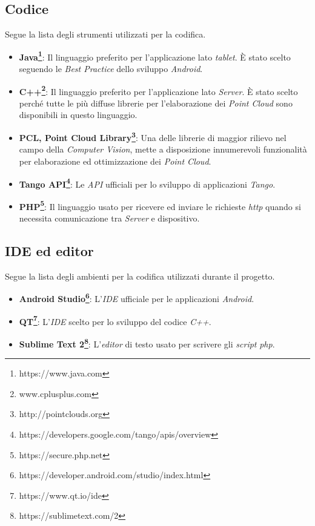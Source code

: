 \subsection{Codice}
Segue la lista degli strumenti utilizzati per la codifica.
\begin{itemize}
	\item \textbf{Java\footnote{https://www.java.com}}: Il linguaggio preferito per l'applicazione lato \emph{tablet}. È stato scelto seguendo le \emph{Best Practice} dello sviluppo \emph{Android}.
	\item \textbf{C++\footnote{www.cplusplus.com}}: Il linguaggio preferito per l'applicazione lato \emph{Server}. È stato scelto perché tutte le più diffuse librerie per l'elaborazione dei \emph{Point Cloud} sono disponibili in questo linguaggio.
	\item \textbf{PCL, Point Cloud Library\footnote{http://pointclouds.org}}: Una delle librerie di maggior rilievo nel campo della \emph{Computer Vision}, mette a disposizione innumerevoli funzionalità per elaborazione ed ottimizzazione dei \emph{Point Cloud}.
	\item \textbf{Tango API\footnote{https://developers.google.com/tango/apis/overview}}: Le \emph{API} ufficiali per lo sviluppo di applicazioni \emph{Tango}.
	\item \textbf{PHP\footnote{https://secure.php.net}}: Il linguaggio usato per ricevere ed inviare le richieste \emph{http} quando si necessita comunicazione tra \emph{Server} e dispositivo.
\end{itemize}

\subsection{IDE ed editor}
Segue la lista degli ambienti per la codifica utilizzati durante il progetto.
\begin{itemize}
	\item \textbf{Android Studio\footnote{https://developer.android.com/studio/index.html}}: L'\emph{IDE} ufficiale per le applicazioni \emph{Android}.
	\item \textbf{QT\footnote{https://www.qt.io/ide}}: L'\emph{IDE} scelto per lo sviluppo del codice \emph{C++}.
	\item \textbf{Sublime Text 2\footnote{https://sublimetext.com/2}}: L'\emph{editor} di testo usato per scrivere gli \emph{script} \emph{php}.
\end{itemize}

